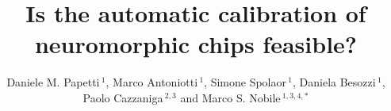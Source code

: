 \documentclass[utf8]{frontiersFPHY} %
\def\firstAuthorLast{Papetti {et~al.}} %
\def\Authors{Daniele M. Papetti\,$^{1}$, Marco Antoniotti\,$^{1}$, Simone Spolaor\,$^{1}$, Daniela Besozzi\,$^{1}$,\\Paolo Cazzaniga\,$^{2,3}$ and Marco S. Nobile\,$^{1,3,4,*}$}
\begin{document}
\onecolumn
{}

\title[]{Is the automatic calibration of neuromorphic chips feasible?} 

\author[\firstAuthorLast ]{\Authors} %
\address{} %
\correspondance{} %

\extraAuth{}%


\maketitle
\end{document}

